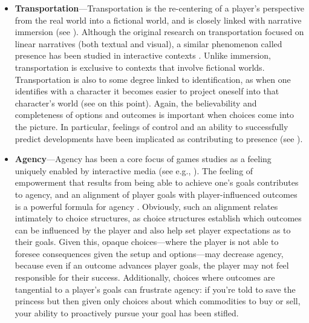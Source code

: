 \begin{itemize}
\item \textbf{Transportation}---Transportation is the re-centering of a player's perspective from the real world into a fictional world, and is closely linked with narrative immersion (see \citep{Green2000,Green2004}).
%
Although the original research on transportation focused on linear narratives (both textual and visual), a similar phenomenon called presence has been studied in interactive contexts \citep{Witmer1998}.
%
Unlike immersion, transportation is exclusive to contexts that involve fictional worlds.
%
Transportation is also to some degree linked to identification, as when one identifies with a character it becomes easier to project oneself into that character's world (see \citep{Busselle2009} on this point).
%
Again, the believability and completeness of options and outcomes is important when choices come into the picture.
%
In particular, feelings of control and an ability to successfully predict developments have been implicated as contributing to presence (see \citep{Witmer1998}).

\item \textbf{Agency}---Agency has been a core focus of games studies as a feeling uniquely enabled by interactive media (see e.g., \citep{Murray1997,Mateas2001,WardripFruin2009,Mason2013}).
%
The feeling of empowerment that results from being able to achieve one's goals contributes to agency, and an alignment of player goals with player-influenced outcomes is a powerful formula for agency \citep{Mateas2001}.
%
Obviously, such an alignment relates intimately to choice structures, as choice structures establish which outcomes can be influenced by the player and also help set player expectations as to their goals.
%
Given this, opaque choices---where the player is not able to foresee consequences given the setup and options---may decrease agency, because even if an outcome advances player goals, the player may not feel responsible for their success.
%
Additionally, choices where outcomes are tangential to a player's goals can frustrate agency: if you're told to save the princess but then given only choices about which commodities to buy or sell, your ability to proactively pursue your goal has been stifled.



\end{itemize}
